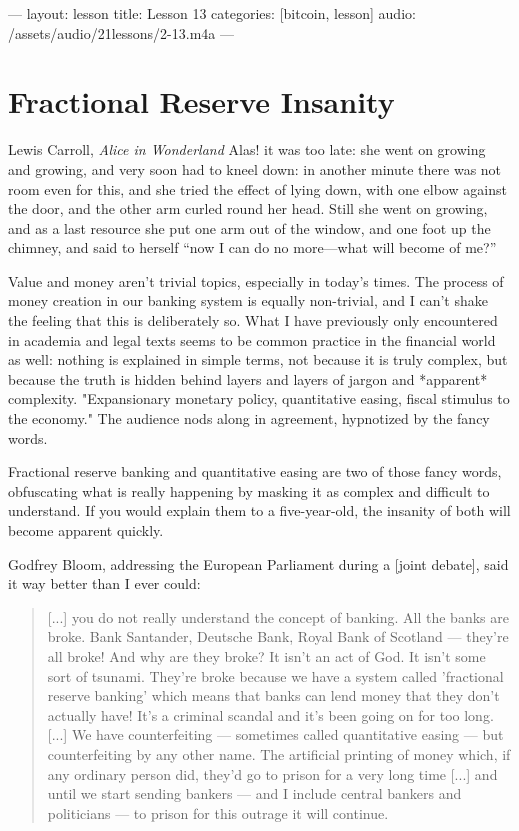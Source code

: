 ---
layout: lesson
title: Lesson 13
categories: [bitcoin, lesson]
audio: /assets/audio/21lessons/2-13.m4a
---

\chapter{ Fractional Reserve Insanity}
\label{les:13}

\begin{chapquote}{Lewis Carroll, \textit{Alice in Wonderland}}
Alas! it was too late: she went on growing and growing, and very soon had to
kneel down: in another minute there was not room even for this, and she tried
the effect of lying down, with one elbow against the door, and the other arm
curled round her head. Still she went on growing, and as a last resource she put
one arm out of the window, and one foot up the chimney, and said to herself
``now I can do no more—what will become of me?''
\end{chapquote}

Value and money aren't trivial topics, especially in today's times. The
process of money creation in our banking system is equally non-trivial,
and I can't shake the feeling that this is deliberately so. What I have
previously only encountered in academia and legal texts seems to be
common practice in the financial world as well: nothing is explained in
simple terms, not because it is truly complex, but because the truth is
hidden behind layers and layers of jargon and *apparent* complexity.
"Expansionary monetary policy, quantitative easing, fiscal stimulus to
the economy." The audience nods along in agreement, hypnotized by the
fancy words.

Fractional reserve banking and quantitative easing are two of those
fancy words, obfuscating what is really happening by masking it as
complex and difficult to understand. If you would explain them to a
five-year-old, the insanity of both will become apparent quickly.

Godfrey Bloom, addressing the European Parliament during a [joint
debate], said it way better than I ever could:

\begin{quotation}
[...] you do not really understand the concept of banking. All the
banks are broke. Bank Santander, Deutsche Bank, Royal Bank of
Scotland --- they're all broke! And why are they broke? It isn't an
act of God. It isn't some sort of tsunami. They're broke because we
have a system called 'fractional reserve banking' which means that
banks can lend money that they don't actually have! It's a criminal
scandal and it's been going on for too long. [...]
We have counterfeiting --- sometimes called quantitative
easing --- but counterfeiting by any other name. The artificial
printing of money which, if any ordinary person did, they'd go to
prison for a very long time [...] and until we start sending
bankers --- and I include central bankers and politicians --- to
prison for this outrage it will continue.
\end{quotation}

